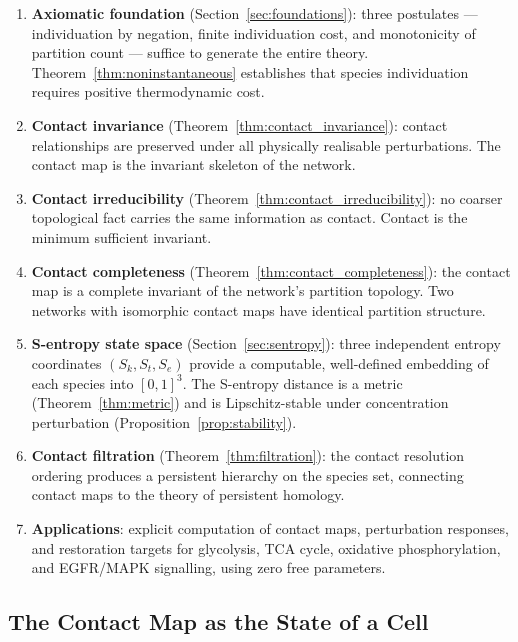 \documentclass[11pt,twocolumn]{article}
\theoremstyle{plain}
\theoremstyle{definition}
\newcommand{\Sk}{S_k}
\newcommand{\St}{S_t}
\newcommand{\Se}{S_e}
\begin{document}
\begin{enumerate}[label=(\roman*)]
\item \textbf{Axiomatic foundation} (Section~\ref{sec:foundations}): three
  postulates --- individuation by negation, finite individuation cost, and
  monotonicity of partition count --- suffice to generate the entire theory.
  Theorem~\ref{thm:noninstantaneous} establishes that species individuation
  requires positive thermodynamic cost.

\item \textbf{Contact invariance} (Theorem~\ref{thm:contact_invariance}):
  contact relationships are preserved under all physically realisable
  perturbations. The contact map is the invariant skeleton of the network.

\item \textbf{Contact irreducibility} (Theorem~\ref{thm:contact_irreducibility}):
  no coarser topological fact carries the same information as contact. Contact
  is the minimum sufficient invariant.

\item \textbf{Contact completeness} (Theorem~\ref{thm:contact_completeness}):
  the contact map is a complete invariant of the network's partition topology.
  Two networks with isomorphic contact maps have identical partition structure.

\item \textbf{S-entropy state space} (Section~\ref{sec:sentropy}): three
  independent entropy coordinates $(\Sk, \St, \Se)$ provide a computable,
  well-defined embedding of each species into $[0,1]^3$. The S-entropy distance
  is a metric (Theorem~\ref{thm:metric}) and is Lipschitz-stable under
  concentration perturbation (Proposition~\ref{prop:stability}).

\item \textbf{Contact filtration} (Theorem~\ref{thm:filtration}): the contact
  resolution ordering produces a persistent hierarchy on the species set,
  connecting contact maps to the theory of persistent homology.

\item \textbf{Applications}: explicit computation of contact maps, perturbation
  responses, and restoration targets for glycolysis, TCA cycle, oxidative
  phosphorylation, and EGFR/MAPK signalling, using zero free parameters.
\end{enumerate}

\subsection{The Contact Map as the State of a Cell}
\end{document}
